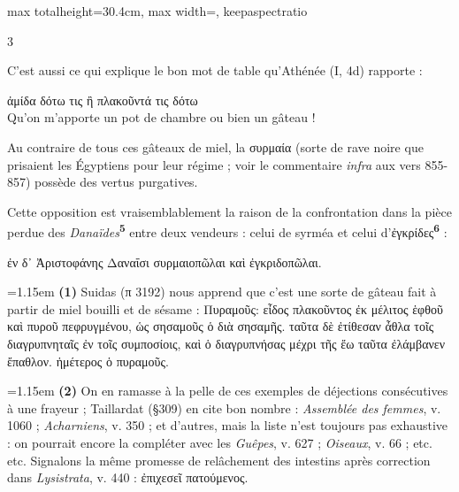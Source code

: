 \documentclass[11pt,twoside]{book}
\newcommand{\italique}[1]{\textit{#1}}
\newcommand{\citComm}[1]{\begin{quoting}[vskip=0.4pt,leftmargin=0.7em,rightmargin=0.2em]#1\end{quoting}}
\newcommand{\grec}[1]{{\policeGr #1}}
\newcommand{\marqueur}[1]{\textsuperscript{\color{rubricRed}\textbf{#1}}}
\begin{document}
\begin{adjustbox}{max totalheight=30.4cm, max width=\textwidth, keepaspectratio}
\begin{minipage}{\textwidth}
{\begin{multicols}{3}
\par\vspace{1.5pt}
\noindent C'est aussi ce qui explique le bon mot de table qu'Athénée (I, 4d) rapporte :
\citComm{ἀμίδα δότω τις ἢ πλακοῦντά τις δότω\\
Qu'on m'apporte un pot de chambre ou bien un gâteau !}
\par\vspace{1.5pt}
\noindent Au contraire de tous ces gâteaux de miel, la συρμαία (sorte de rave noire que prisaient les Égyptiens pour leur régime ; voir le commentaire \italique{infra} aux vers 855-857) possède des vertus purgatives.
\par\vspace{1.5pt}
\noindent Cette opposition est vraisemblablement la raison de la confrontation dans la pièce perdue des \italique{Danaïdes}\marqueur{5} entre deux vendeurs : celui de syrméa et celui d'ἐγκρίδες\marqueur{6} :
\citComm{ἐν δ᾿ Ἀριστοφάνης Δαναΐσι συρμαιοπῶλαι καὶ ἐγκριδοπῶλαι.}
\par\vspace{1.5pt}
\par\vspace{1.2pt}\par\nopagebreak\vspace{1pt}\noindent\hangindent=1.15em {\color{sepiaNote}\textbf{(1)}} Suidas (π 3192) nous apprend que c'est une sorte de gâteau fait à partir de miel bouilli et de sésame : Πυραμοῦς: εἶδος πλακοῦντος ἐκ μέλιτος ἑφθοῦ καὶ πυροῦ πεφρυγμένου, ὡς σησαμοῦς ὁ διὰ σησαμῆς. ταῦτα δὲ ἐτίθεσαν ἆθλα τοῖς διαγρυπνηταῖς ἐν τοῖς συμποσίοις, καὶ ὁ διαγρυπνήσας μέχρι τῆς ἔω ταῦτα ἐλάμβανεν ἔπαθλον. ἡμέτερος ὁ πυραμοῦς.
\par\vspace{1.5pt}
\noindent\hangindent=1.15em {\color{sepiaNote}\textbf{(2)}} On en ramasse à la pelle de ces exemples de déjections consécutives à une frayeur ; Taillardat (§309) en cite bon nombre : \italique{Assemblée des femmes}, v. 1060 ; \italique{Acharniens}, v. 350 ; et d'autres, mais la liste n'est toujours pas exhaustive : on pourrait encore la compléter avec les \italique{Guêpes}, v. 627 ; \italique{Oiseaux}, v. 66 ; etc. etc. Signalons la même promesse de relâchement des intestins après correction dans \italique{Lysistrata}, v. 440 : \grec{ἐπιχεσεῖ πατούμενος}.
\par\vspace{1.5pt}

\end{multicols}}
\end{minipage}
\end{adjustbox}
\end{document}
